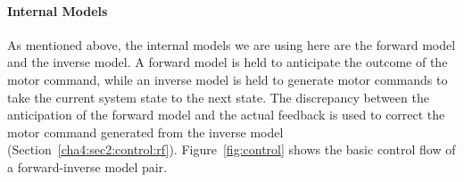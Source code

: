 %
%
%
%
%
%
%



\paragraph{Internal Models}


As mentioned above, the internal models we are using here are the forward model and the inverse model.
A forward model is held to anticipate the outcome of the motor command, while an inverse model is held to generate motor commands to take the current system state to the next state. The discrepancy between the anticipation of the forward model and the actual feedback is used to correct the motor command generated from the inverse model (Section~\ref{cha4:sec2:control:rf}). Figure~\ref{fig:control} shows the basic control flow of a forward-inverse model pair.

